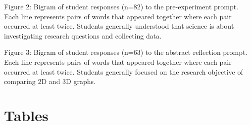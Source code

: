 \documentclass[
  12pt,
]{article}
\begin{document}
Figure 2: Bigram of student responses (n=82) to the pre-experiment
prompt. Each line represents pairs of words that appeared together where
each pair occurred at least twice. Students generally understood that
science is about investigating research questions and collecting data.

Figure 3: Bigram of student responses (n=63) to the abstract reflection
prompt. Each line represents pairs of words that appeared together where
each pair occurred at least twice. Students generally focused on the
research objective of comparing 2D and 3D graphs.

\newpage

\section{Tables}\label{tables}
\end{document}
